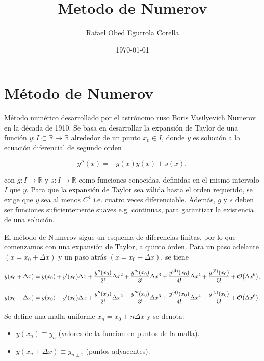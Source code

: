 \documentclass[11pt]{article}
\author{Rafael Obed Egurrola Corella}
\date{\today}
\title{Metodo de Numerov}
\begin{document}
\maketitle
\tableofcontents

\section{Método de Numerov}
\label{sec:org0e93a3f}

Método numérico desarrollado por el astrónomo ruso Boris Vasilyevich Numerov en la década de 1910. Se basa en desarrollar la expansión de Taylor de una función \(y : I \subset \mathbb{R} \to \mathbb{R}\) alrededor de un punto \(x_0 \in I\), donde \(y\) es solución a la ecuación diferencial de segundo orden

\begin{equation}
\label{eq:numerov-eq}
    y''(x) = - g(x)y(x) + s(x),
\end{equation}

con \(g: I \to \mathbb{R}\) y \(s: I \to \mathbb{R}\) como funciones conocidas, definidas en el mismo intervalo \(I\) que \(y\). Para que la expansión de Taylor sea válida hasta el orden requerido, se exige que \(y\) sea al menos \(C^4\) i.e. cuatro veces diferenciable. Además, \(g\) y \(s\) deben ser funciones suficientemente suaves e.g. continuas, para garantizar la existencia de una solución.

El método de Numerov sigue un esquema de diferencias finitas, por lo que comenzamos con una expansión de Taylor, a quinto órden. Para un paso adelante \((x= x_{0} + \Delta x)\) y un paso atrás \((x=x_{0} - \Delta x)\), se tiene

\[ y(x_{0} + \Delta x ) = y(x_{0}) + y'(x_{0})\Delta x + \frac{y''(x_{0})}{2!} \Delta x^2 + \frac{y'''(x_{0})}{3!}\Delta x^3 + \frac{y^{(4)}(x_{0})}{4!}\Delta x^4 + \frac{y^{(5)}(x_0)}{5!} + \order{\Delta x^6}, \]

\[ y(x_{0} - \Delta x ) = y(x_{0}) - y'(x_{0})\Delta x + \frac{y''(x_{0})}{2!} \Delta x^2 - \frac{y'''(x_{0})}{3!}\Delta x^3 + \frac{y^{(4)}(x_{0})}{4!}\Delta x^4 - \frac{y^{(5)}(x_0)}{5!} + \order{\Delta x^6}. \]

Se define una malla uniforme \(x_n = x_0 + n\Delta x\) y se denota:

\begin{itemize}
\item \(y(x_n) \equiv y_n\) (valores de la funcion en puntos de la malla).
\item \(y(x_n \pm \Delta x) \equiv y_{n \pm 1}\) (puntos adyacentes).
\end{itemize}
\end{document}
